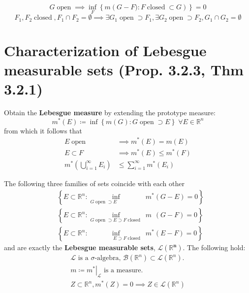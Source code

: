\documentclass[letterpaper,11pt,intlimits,sumlimits]{amsart}
\newcommand{\Borel}[1]{\mathcal{B}\left({#1}\right)}
\newcommand{\reals}{\mathbb{R}}
\newcommand{\keyphrase}[1]{\textbf{#1}}
\DeclareMathOperator{\open}{open}
\DeclareMathOperator{\closed}{closed}
\begin{document}
\[
    G \open \implies
    \inf_{F} \left\{ m\left( G-F) : F \closed \subset G \right) \right\} = 0
\]
\[
    F_{1}, F_{2} \closed, F_{1}\cap{}F_{2}=\emptyset
    \implies
    \exists G_{1}\open\supset{}F_{1},
    \exists G_{2}\open\supset{}F_{2},
    G_{1}\cap{}G_{2}=\emptyset
\]

\section*{Characterization of Lebesgue measurable sets (Prop. 3.2.3, Thm 3.2.1)}

Obtain the \keyphrase{Lebesgue measure} by extending the prototype measure:
\[
    m^{*}\left( E \right) \coloneqq \inf \left\{
        m\left( G \right): G \open \supset E
        \right\} \; \forall E \in \reals^{n}
\]
from which it follows that
\begin{align*}
    E \open &\implies m^{*}\left( E \right) = m\left( E \right)
    \tag{i} \\
    E \subset F &\implies m^{*}\left( E \right)\leq{}m^{*}\left( F \right)
    \tag{ii} \\
    m^{*}\left( \bigcup_{i=1}^{\infty} E_{i} \right)
    &\leq
    \sum_{i=1}^{\infty} m^{*} \left( E_{i} \right)
    \tag{iii}
\end{align*}

The following three families of sets coincide with each other
\begin{align*}
    &\left\{E\subset\reals^{n}:
    \inf_{G \open\supset{}E\phantom{\supset{}F\closed}}
    \;m^{*}\left( G-E \right) = 0
    \right\}
    \tag{3.2.3 a} \\
    &\left\{E\subset\reals^{n}:
    \inf_{G\open\supset{}E\supset{}F\closed}
    \;m^{\phantom{*}}\left( G-F \right) = 0
    \right\}
    \tag{3.2.3 b} \\
    &\left\{E\subset\reals^{n}:
    \inf_{\phantom{G\open\supset}E\supset{}F\closed}
    \;m^{*}\left( E-F \right) = 0
    \right\}
    \tag{3.2.3 c}
\end{align*}
and are exactly the \keyphrase{Lebesgue measurable sets},
$\boldsymbol{\mathcal{L}\left( \reals^{n} \right)}$.  The following hold:
\begin{align*}
    \mathcal{L} \text{ is a $\sigma$-algebra, }
    \Borel{\reals^{n}}\subset\mathcal{L}\left( \reals^{n} \right).
    \tag{3.2.1 i} \\
    m \coloneqq \left.m^{*}\right|_{\mathcal{L}} \text{ is a measure. }
    \tag{3.2.1 ii} \\
    Z\subset\reals^{n}, m^{*}\left( Z \right) = 0
    \implies Z \in \mathcal{L}\left( \reals^{n} \right)
    \tag{Corollary}
\end{align*}
\end{document}

